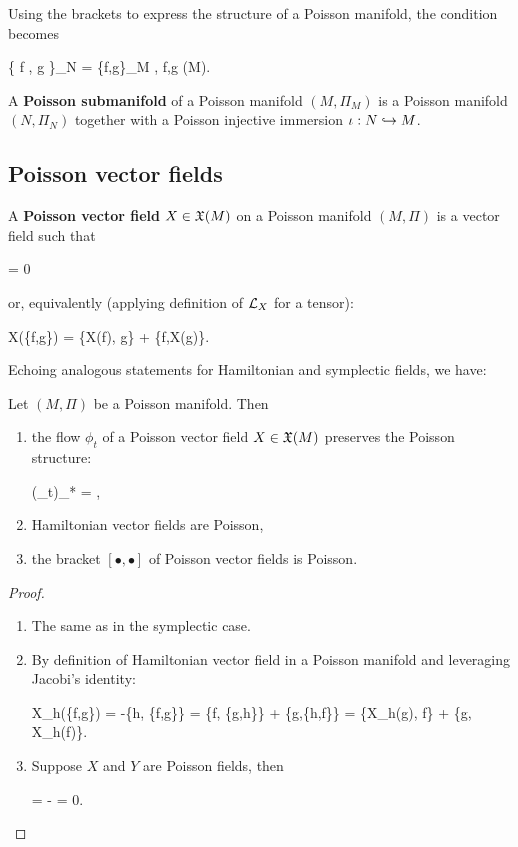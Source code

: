 \documentclass[main.tex]{subfiles}
\begin{document}
Using the brackets to express the structure of a Poisson manifold, the condition becomes
\begin{eqalign}
	\{ f \circ \phi, g \circ \phi \}_N = \{f,g\}_M \circ \phi, \quad \forall f,g \in \Cinfty(M).
\end{eqalign}

\begin{definition}
	A \textbf{Poisson submanifold} of a Poisson manifold $(M, \Pi_M)$ is a Poisson manifold $(N, \Pi_N)$ together with a Poisson injective immersion $\iota: N \hookrightarrow M$.
\end{definition}

\subsection{Poisson vector fields}

\begin{definition}
	A \textbf{Poisson vector field} $X \in \mathfrak{X}(M)$ on a Poisson manifold $(M, \Pi)$ is a vector field such that
	\begin{eqalign}
		 \Pi = 0
	\end{eqalign}
	or, equivalently (applying definition of $\mathcal{L}_{X}$ for a tensor):
	\begin{eqalign}
		X(\{f,g\}) = \{X(f), g\} + \{f,X(g)\}.
	\end{eqalign}
\end{definition}

Echoing analogous statements for Hamiltonian and symplectic fields, we have:

\begin{theorem}
	Let $(M,\Pi)$ be a Poisson manifold. Then
	\begin{enumerate}
		\item the flow $\phi_t$ of a Poisson vector field $X \in \mathfrak{X}(M)$ preserves the Poisson structure:
		\begin{eqalign}
			(\phi_t)_* \Pi = \Pi,
		\end{eqalign}
		\item Hamiltonian vector fields are Poisson,
		\item the bracket $[\bullet, \bullet]$ of Poisson vector fields is Poisson.
	\end{enumerate}
\end{theorem}
\begin{proof}
	\leavevmode
	\begin{enumerate}
		\item The same as in the symplectic case.
		\item By definition of Hamiltonian vector field in a Poisson manifold and leveraging Jacobi's identity:
		\begin{eqalign}
			X_h(\{f,g\}) = -\{h, \{f,g\}\} = \{f, \{g,h\}\} + \{g,\{h,f\}\} = \{X_h(g), f\} + \{g, X_h(f)\}.
		\end{eqalign}
		\item Suppose $X$ and $Y$ are Poisson fields, then
		\begin{eqalign}
			\Lie{[X,Y]}\Pi = \Lie{Y}\Pi - \Pi = 0.
		\end{eqalign}
	\end{enumerate}
\end{proof}
\end{document}
